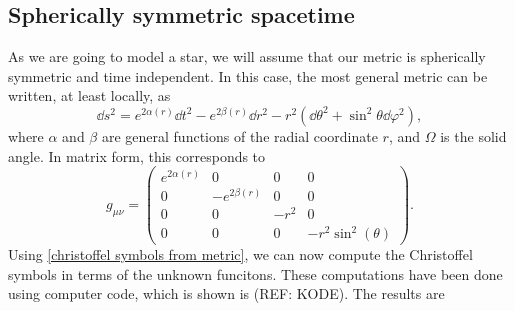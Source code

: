 \subsection*{Spherically symmetric spacetime}

As we are going to model a star, we will assume that our metric is spherically symmetric and time independent.
In this case, the most general metric can be written, at least locally, as
%
\begin{equation}
    \dd s^2 
    = e^{2\alpha(r)} \dd t^2 - e^{2 \beta(r)} \dd r^2 - 
    r^2 (\dd \theta^2 + \sin^2 \theta \dd \varphi^2),
\end{equation}
%
where $\alpha$ and $\beta$ are general functions of the radial coordinate $r$, and $\Omega$ is the solid angle.
In matrix form, this corresponds to 
%
\begin{equation}
    \label{spherically symmetric metric}
    g_{\mu \nu} =
    \left(
        \begin{matrix}
            e^{2 \alpha{\left(r \right)}} & 0 & 0 & 0\\
            0 & - e^{2 \beta{\left(r \right)}} & 0 & 0
            \\0 & 0 & - r^{2} & 0
            \\0 & 0 & 0 & - r^{2} \sin^{2}{\left(\theta \right)}
        \end{matrix}
     \right).
\end{equation}
%
Using \autoref{christoffel symbols from metric}, we can now compute the Christoffel symbols in terms of the unknown funcitons.
These computations have been done using computer code, which is shown is (REF: KODE).
The results are
%
